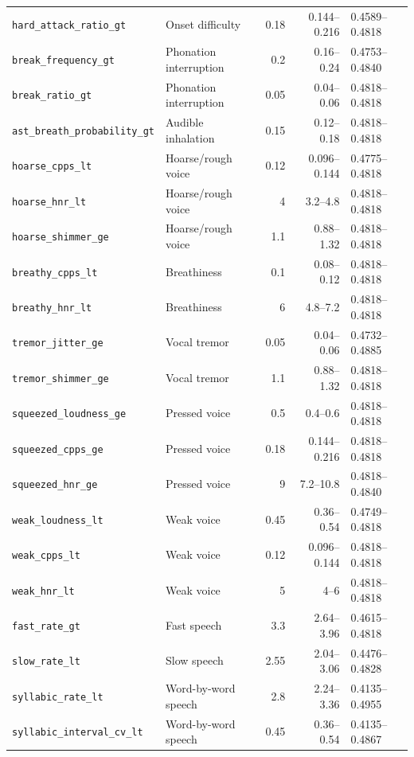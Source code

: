 \documentclass[10pt]{article}
\begin{document}
\begin{longtable}{p{}p{}rrp{}}
\texttt{hard\_attack\_ratio\_gt} & Onset difficulty & 0.18 & 0.144--0.216 & 0.4589--0.4818 \\
\texttt{break\_frequency\_gt} & Phonation interruption & 0.2 & 0.16--0.24 & 0.4753--0.4840 \\
\texttt{break\_ratio\_gt} & Phonation interruption & 0.05 & 0.04--0.06 & 0.4818--0.4818 \\
\texttt{ast\_breath\_probability\_gt} & Audible inhalation & 0.15 & 0.12--0.18 & 0.4818--0.4818 \\
\texttt{hoarse\_cpps\_lt} & Hoarse/rough voice & 0.12 & 0.096--0.144 & 0.4775--0.4818 \\
\texttt{hoarse\_hnr\_lt} & Hoarse/rough voice & 4 & 3.2--4.8 & 0.4818--0.4818 \\
\texttt{hoarse\_shimmer\_ge} & Hoarse/rough voice & 1.1 & 0.88--1.32 & 0.4818--0.4818 \\
\texttt{breathy\_cpps\_lt} & Breathiness & 0.1 & 0.08--0.12 & 0.4818--0.4818 \\
\texttt{breathy\_hnr\_lt} & Breathiness & 6 & 4.8--7.2 & 0.4818--0.4818 \\
\texttt{tremor\_jitter\_ge} & Vocal tremor & 0.05 & 0.04--0.06 & 0.4732--0.4885 \\
\texttt{tremor\_shimmer\_ge} & Vocal tremor & 1.1 & 0.88--1.32 & 0.4818--0.4818 \\
\texttt{squeezed\_loudness\_ge} & Pressed voice & 0.5 & 0.4--0.6 & 0.4818--0.4818 \\
\texttt{squeezed\_cpps\_ge} & Pressed voice & 0.18 & 0.144--0.216 & 0.4818--0.4818 \\
\texttt{squeezed\_hnr\_ge} & Pressed voice & 9 & 7.2--10.8 & 0.4818--0.4840 \\
\texttt{weak\_loudness\_lt} & Weak voice & 0.45 & 0.36--0.54 & 0.4749--0.4818 \\
\texttt{weak\_cpps\_lt} & Weak voice & 0.12 & 0.096--0.144 & 0.4818--0.4818 \\
\texttt{weak\_hnr\_lt} & Weak voice & 5 & 4--6 & 0.4818--0.4818 \\
\texttt{fast\_rate\_gt} & Fast speech & 3.3 & 2.64--3.96 & 0.4615--0.4818 \\
\texttt{slow\_rate\_lt} & Slow speech & 2.55 & 2.04--3.06 & 0.4476--0.4828 \\
\texttt{syllabic\_rate\_lt} & Word-by-word speech & 2.8 & 2.24--3.36 & 0.4135--0.4955 \\
\texttt{syllabic\_interval\_cv\_lt} & Word-by-word speech & 0.45 & 0.36--0.54 & 0.4135--0.4867 \\

\end{longtable}
\end{document}
